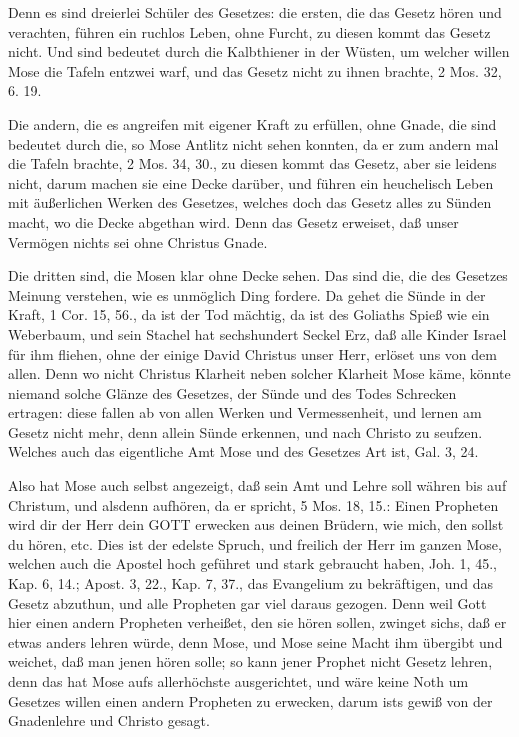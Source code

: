 Denn es sind dreierlei Schüler des Gesetzes: die ersten, die das Gesetz hören und verachten, führen ein ruchlos Leben, ohne Furcht, zu diesen kommt das Gesetz nicht. Und sind bedeutet durch die Kalbthiener in der Wüsten, um welcher willen Mose die Tafeln entzwei warf, und das Gesetz nicht zu ihnen brachte, 2 Mos. 32, 6. 19.

Die andern, die es angreifen mit eigener Kraft zu erfüllen, ohne Gnade, die sind bedeutet durch die, so Mose Antlitz nicht sehen konnten, da er zum andern mal die Tafeln brachte, 2 Mos. 34, 30., zu diesen kommt das Gesetz, aber sie leidens nicht, darum machen sie eine Decke darüber, und führen ein heuchelisch Leben mit äußerlichen Werken des Gesetzes, welches doch das Gesetz alles zu Sünden macht, wo die Decke abgethan wird. Denn das Gesetz erweiset, daß unser Vermögen nichts sei ohne Christus Gnade.

Die dritten sind, die Mosen klar ohne Decke sehen. Das sind die, die des Gesetzes Meinung verstehen, wie es unmöglich Ding fordere. Da gehet die Sünde in der Kraft, 1 Cor. 15, 56., da ist der Tod mächtig, da ist des Goliaths Spieß wie ein Weberbaum, und sein Stachel hat sechshundert Seckel Erz, daß alle Kinder Israel für ihm fliehen, ohne der einige David Christus unser Herr, erlöset uns von dem allen. Denn wo nicht Christus Klarheit neben solcher Klarheit Mose käme, könnte niemand solche Glänze des Gesetzes, der Sünde und des Todes Schrecken ertragen: diese fallen ab von allen Werken und Vermessenheit, und lernen am Gesetz nicht mehr, denn allein Sünde erkennen, und nach Christo zu seufzen. Welches auch das eigentliche Amt Mose und des Gesetzes Art ist, Gal. 3, 24.

Also hat Mose auch selbst angezeigt, daß sein Amt und Lehre soll währen bis auf Christum, und alsdenn aufhören, da er spricht, 5 Mos. 18, 15.: Einen Propheten wird dir der Herr dein GOTT erwecken aus deinen Brüdern, wie mich, den sollst du hören, etc. Dies ist der edelste Spruch, und freilich der Herr im ganzen Mose, welchen auch die Apostel hoch geführet und stark gebraucht haben, Joh. 1, 45., Kap. 6, 14.; Apost. 3, 22., Kap. 7, 37., das Evangelium zu bekräftigen, und das Gesetz abzuthun, und alle Propheten gar viel daraus gezogen. Denn weil Gott hier einen andern Propheten verheißet, den sie hören sollen, zwinget sichs, daß er etwas anders lehren würde, denn Mose, und Mose seine Macht ihm übergibt und weichet, daß man jenen hören solle; so kann jener Prophet nicht Gesetz lehren, denn das hat Mose aufs allerhöchste ausgerichtet, und wäre keine Noth um Gesetzes willen einen andern Propheten zu erwecken, darum ists gewiß von der Gnadenlehre und Christo gesagt.

